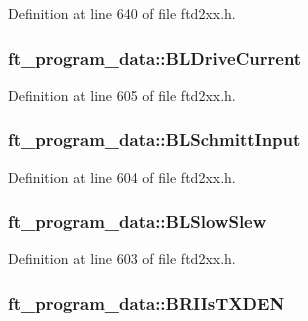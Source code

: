 Definition at line 640 of file ftd2xx.h.\hypertarget{structft__program__data_a8a55bd4110d2ad36f31260db9c627a5a}{
\subsubsection[{BLDriveCurrent}]{ {\bf ft\_\-program\_\-data::BLDriveCurrent}}}
\label{structft__program__data_a8a55bd4110d2ad36f31260db9c627a5a}


Definition at line 605 of file ftd2xx.h.\hypertarget{structft__program__data_a426b76846e4db7ecd9e4ce2660a2d680}{
\subsubsection[{BLSchmittInput}]{ {\bf ft\_\-program\_\-data::BLSchmittInput}}}
\label{structft__program__data_a426b76846e4db7ecd9e4ce2660a2d680}


Definition at line 604 of file ftd2xx.h.\hypertarget{structft__program__data_a2ad27a0b136d52c82e97be0596d24f7d}{
\subsubsection[{BLSlowSlew}]{ {\bf ft\_\-program\_\-data::BLSlowSlew}}}
\label{structft__program__data_a2ad27a0b136d52c82e97be0596d24f7d}


Definition at line 603 of file ftd2xx.h.\hypertarget{structft__program__data_af35654fab6e4041be1cea5daa8771f07}{
\subsubsection[{BRIIsTXDEN}]{ {\bf ft\_\-program\_\-data::BRIIsTXDEN}}}
\label{structft__program__data_af35654fab6e4041be1cea5daa8771f07}


